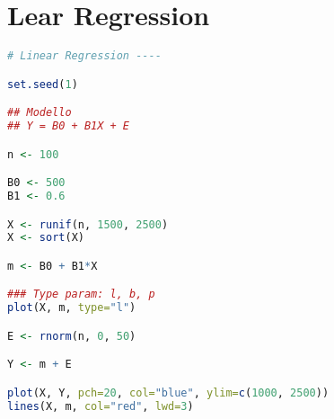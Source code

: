 \chapter{Lear Regression}

\begin{lstlisting}[language=R]
# Linear Regression ----

set.seed(1)

## Modello
## Y = B0 + B1X + E

n <- 100

B0 <- 500
B1 <- 0.6

X <- runif(n, 1500, 2500)
X <- sort(X)

m <- B0 + B1*X

### Type param: l, b, p
plot(X, m, type="l")

E <- rnorm(n, 0, 50)

Y <- m + E

plot(X, Y, pch=20, col="blue", ylim=c(1000, 2500))
lines(X, m, col="red", lwd=3)





\end{lstlisting}